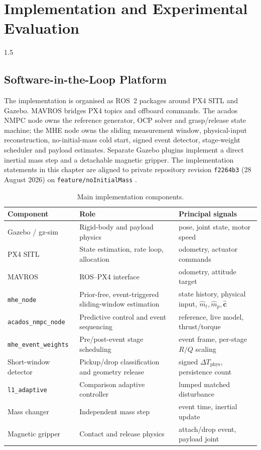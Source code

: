\chapter{Implementation and Experimental Evaluation}
\label{ch:evaluation}
\begin{spacing}{1.5}
\setlength{\parskip}{0.22in}

\section{Software-in-the-Loop Platform}

The implementation is organised as ROS~2 packages around PX4 SITL and Gazebo. MAVROS bridges PX4 topics and offboard commands. The acados NMPC node owns the reference generator, OCP solver and grasp/release state machine; the MHE node owns the sliding measurement window, physical-input reconstruction, no-initial-mass cold start, signed event detector, stage-weight scheduler and payload estimates. Separate Gazebo plugins implement a direct inertial mass step and a detachable magnetic gripper. The implementation statements in this chapter are aligned to private repository revision \texttt{f2264b3} (28 August 2026) on \texttt{feature/noInitialMass} \cite{yoyo2026mhenmpc}.

\begin{table}[ht]
\centering
\caption{Main implementation components.}
\label{tab:software}
\begin{tabularx}{\textwidth}{@{}l X X@{}}
\toprule
\textbf{Component} & \textbf{Role} & \textbf{Principal signals} \\
\midrule
Gazebo / gz-sim & Rigid-body and payload physics & pose, joint state, motor speed \\
PX4 SITL & State estimation, rate loop, allocation & odometry, actuator commands \\
MAVROS & ROS--PX4 interface & odometry, attitude target \\
\texttt{mhe\_node} & Prior-free, event-triggered sliding-window estimation & state history, physical input, $\hat m_t,\hat m_p,\hat{\bm c}$ \\
\texttt{acados\_nmpc\_node} & Predictive control and event sequencing & reference, live model, thrust/torque \\
\texttt{mhe\_event\_weights} & Pre/post-event stage scheduling & event frame, per-stage $R/Q$ scaling \\
Short-window detector & Pickup/drop classification and geometry release & signed $\Delta T_{\mathrm{phys}}$, persistence count \\
\texttt{l1\_adaptive} & Comparison adaptive controller & lumped matched disturbance \\
Mass changer & Independent mass step & event time, inertial update \\
Magnetic gripper & Contact and release physics & attach/drop event, payload joint \\
\bottomrule
\end{tabularx}
\end{table}


\end{spacing}
